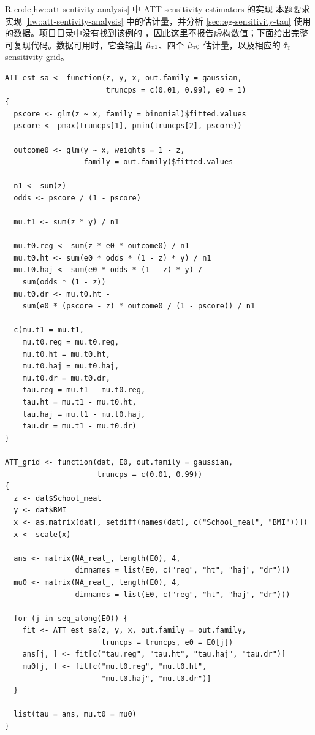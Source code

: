 \begin{exercisesolution}{R code}{\cref{hw::att-sentivity-analysis} 中 ATT sensitivity estimators 的实现}
本题要求实现 \cref{hw::att-sentivity-analysis} 中的估计量，并分析 \cref{sec::eg-sensitivity-tau} 使用的数据。项目目录中没有找到该例的 ，因此这里不报告虚构数值；下面给出完整可复现代码。数据可用时，它会输出 $\hat\mu_{\textsc{t}1}$、四个 $\hat\mu_{\textsc{t}0}$ 估计量，以及相应的 $\hat\tau_{\textsc{t}}$ sensitivity grid。

\begin{lstlisting}
ATT_est_sa <- function(z, y, x, out.family = gaussian,
                       truncps = c(0.01, 0.99), e0 = 1)
{
  pscore <- glm(z ~ x, family = binomial)$fitted.values
  pscore <- pmax(truncps[1], pmin(truncps[2], pscore))

  outcome0 <- glm(y ~ x, weights = 1 - z,
                  family = out.family)$fitted.values

  n1 <- sum(z)
  odds <- pscore / (1 - pscore)

  mu.t1 <- sum(z * y) / n1

  mu.t0.reg <- sum(z * e0 * outcome0) / n1
  mu.t0.ht <- sum(e0 * odds * (1 - z) * y) / n1
  mu.t0.haj <- sum(e0 * odds * (1 - z) * y) /
    sum(odds * (1 - z))
  mu.t0.dr <- mu.t0.ht -
    sum(e0 * (pscore - z) * outcome0 / (1 - pscore)) / n1

  c(mu.t1 = mu.t1,
    mu.t0.reg = mu.t0.reg,
    mu.t0.ht = mu.t0.ht,
    mu.t0.haj = mu.t0.haj,
    mu.t0.dr = mu.t0.dr,
    tau.reg = mu.t1 - mu.t0.reg,
    tau.ht = mu.t1 - mu.t0.ht,
    tau.haj = mu.t1 - mu.t0.haj,
    tau.dr = mu.t1 - mu.t0.dr)
}

ATT_grid <- function(dat, E0, out.family = gaussian,
                     truncps = c(0.01, 0.99))
{
  z <- dat$School_meal
  y <- dat$BMI
  x <- as.matrix(dat[, setdiff(names(dat), c("School_meal", "BMI"))])
  x <- scale(x)

  ans <- matrix(NA_real_, length(E0), 4,
                dimnames = list(E0, c("reg", "ht", "haj", "dr")))
  mu0 <- matrix(NA_real_, length(E0), 4,
                dimnames = list(E0, c("reg", "ht", "haj", "dr")))

  for (j in seq_along(E0)) {
    fit <- ATT_est_sa(z, y, x, out.family = out.family,
                      truncps = truncps, e0 = E0[j])
    ans[j, ] <- fit[c("tau.reg", "tau.ht", "tau.haj", "tau.dr")]
    mu0[j, ] <- fit[c("mu.t0.reg", "mu.t0.ht",
                      "mu.t0.haj", "mu.t0.dr")]
  }

  list(tau = ans, mu.t0 = mu0)
}


\end{lstlisting}
\end{exercisesolution}

